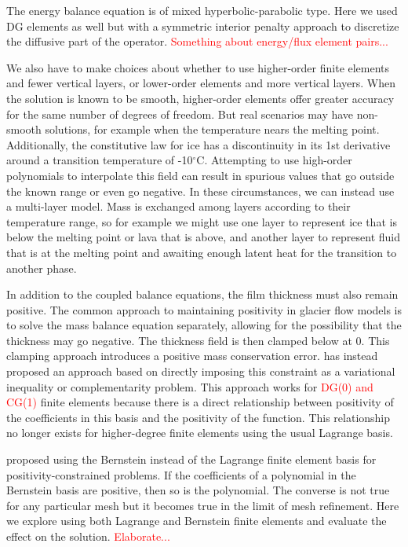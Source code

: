 \documentclass{article}
\theoremstyle{definition}
\theoremstyle{plain}
\begin{document}
The energy balance equation is of mixed hyperbolic-parabolic type.
Here we used DG elements as well but with a symmetric interior penalty approach to discretize the diffusive part of the operator.
\textcolor{red}{Something about energy/flux element pairs...}

We also have to make choices about whether to use higher-order finite elements and fewer vertical layers, or lower-order elements and more vertical layers.
When the solution is known to be smooth, higher-order elements offer greater accuracy for the same number of degrees of freedom.
But real scenarios may have non-smooth solutions, for example when the temperature nears the melting point.
Additionally, the constitutive law for ice has a discontinuity in its 1st derivative around a transition temperature of -10${}^\circ$C.
Attempting to use high-order polynomials to interpolate this field can result in spurious values that go outside the known range or even go negative.
In these circumstances, we can instead use a multi-layer model.
Mass is exchanged among layers according to their temperature range, so for example we might use one layer to represent ice that is below the melting point or lava that is above, and another layer to represent fluid that is at the melting point and awaiting enough latent heat for the transition to another phase.

In addition to the coupled balance equations, the film thickness must also remain positive.
The common approach to maintaining positivity in glacier flow models is to solve the mass balance equation separately, allowing for the possibility that the thickness may go negative.
The thickness field is then clamped below at 0.
This clamping approach introduces a positive mass conservation error.
\citet{bueler2021conservation} has instead proposed an approach based on directly imposing this constraint as a variational inequality or complementarity problem.
This approach works for \textcolor{red}{DG(0) and CG(1)} finite elements because there is a direct relationship between positivity of the coefficients in this basis and the positivity of the function.
This relationship no longer exists for higher-degree finite elements using the usual Lagrange basis.

\citet{kirby2024high} proposed using the Bernstein instead of the Lagrange finite element basis for positivity-constrained problems.
If the coefficients of a polynomial in the Bernstein basis are positive, then so is the polynomial.
The converse is not true for any particular mesh but it becomes true in the limit of mesh refinement.
Here we explore using both Lagrange and Bernstein finite elements and evaluate the effect on the solution.
\textcolor{red}{Elaborate...}
\end{document}
